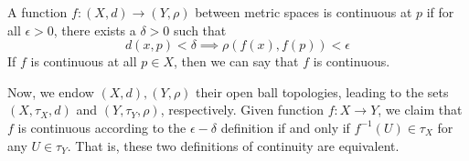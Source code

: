 \documentclass{article}
\begin{document}
  \begin{definition}
  A function $f: (X, d) \longrightarrow (Y, \rho)$ between metric spaces is continuous at $p$ if for all $\epsilon > 0$, there exists a $\delta > 0$ such that 
  \[ d(x, p) < \delta \implies \rho ( f(x), f(p)) < \epsilon\]
  If $f$ is continuous at all $p \in X$, then we can say that $f$ is continuous.
  \end{definition}

  \begin{theorem}
  Now, we endow $(X, d), (Y, \rho)$ their open ball topologies, leading to the sets $(X, \tau_X, d)$ and $(Y, \tau_Y, \rho)$, respectively. Given function $f: X \longrightarrow Y$, we claim that $f$ is continuous according to the $\epsilon - \delta$ definition if and only if $f^{-1}(U) \in \tau_{X}$ for any $U \in \tau_Y$. That is, these two definitions of continuity are equivalent. 
  \end{theorem}
\end{document}
